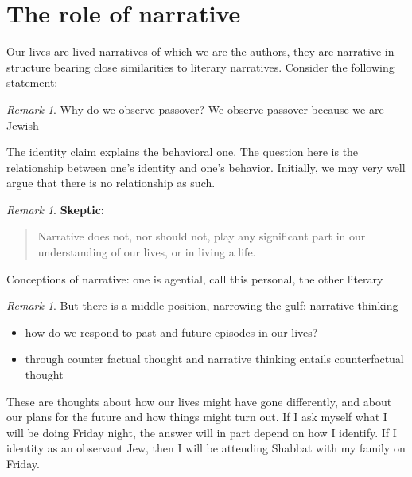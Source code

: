 \documentclass[12pt]{book}
\theoremstyle{definition}
\theoremstyle{remark}
\newtheorem{remark}[theorem]{Remark}
\begin{document}
\section{The role of narrative}\label{the-role-of-narrative}

Our lives are lived narratives of which we are the authors, they are narrative in structure bearing close similarities to literary narratives. Consider the following statement:

\begin{remark}
Why do we observe passover? We observe passover because we are Jewish
\end{remark}

The identity claim explains the behavioral one. The question here is the relationship between one's identity and one's behavior. Initially, we may very well argue that there is no relationship as such.

\begin{remark}

\textbf{Skeptic:}

\begin{quote}
Narrative does not, nor should not, play any significant part in our understanding of our lives, or in living a life.
\end{quote}

\end{remark}

Conceptions of narrative: one is agential, call this personal, the other literary

\begin{remark}

But there is a middle position, narrowing the gulf: narrative thinking

\begin{itemize}
\item
  how do we respond to past and future episodes in our lives?
\item
  through counter factual thought and narrative thinking entails counterfactual thought
\end{itemize}

\end{remark}

These are thoughts about how our lives might have gone differently, and about our plans for the future and how things might turn out. If I ask myself what I will be doing Friday night, the answer will in part depend on how I identify. If I identity as an observant Jew, then I will be attending Shabbat with my family on Friday.
\end{document}
